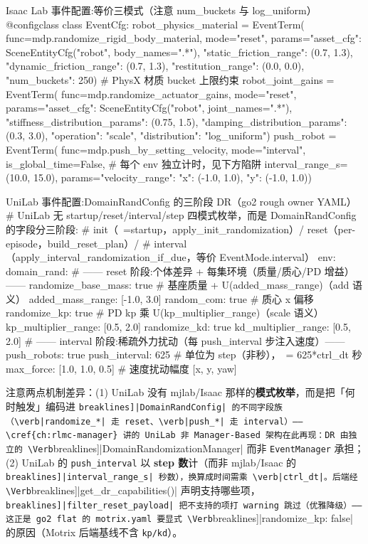 \begin{codebox}[Python]{Isaac Lab 事件配置:等价三模式（注意 num\_buckets 与 log\_uniform）}
@configclass
class EventCfg:
    robot_physics_material = EventTerm(
        func=mdp.randomize_rigid_body_material, mode="reset",
        params={"asset_cfg": SceneEntityCfg("robot", body_names=".*"),
                "static_friction_range": (0.7, 1.3),
                "dynamic_friction_range": (0.7, 1.3),
                "restitution_range": (0.0, 0.0),
                "num_buckets": 250})           # PhysX 材质 bucket 上限约束
    robot_joint_gains = EventTerm(
        func=mdp.randomize_actuator_gains, mode="reset",
        params={"asset_cfg": SceneEntityCfg("robot", joint_names=".*"),
                "stiffness_distribution_params": (0.75, 1.5),
                "damping_distribution_params": (0.3, 3.0),
                "operation": "scale", "distribution": "log_uniform"})
    push_robot = EventTerm(
        func=mdp.push_by_setting_velocity, mode="interval",
        is_global_time=False,                  # 每个 env 独立计时，见下方陷阱
        interval_range_s=(10.0, 15.0),
        params={"velocity_range": {"x": (-1.0, 1.0), "y": (-1.0, 1.0)}})
\end{codebox}

\begin{codebox}[Python]{UniLab 事件配置:DomainRandConfig 的三阶段 DR（go2 rough owner YAML）}
# UniLab 无 startup/reset/interval/step 四模式枚举，而是 DomainRandConfig 的字段分三阶段:
#   init（~=startup，apply_init_randomization）/ reset（per-episode，build_reset_plan）/
#   interval（apply_interval_randomization_if_due，等价 EventMode.interval）
env:
  domain_rand:
    # —— reset 阶段:个体差异 + 每集环境（质量/质心/PD 增益）——
    randomize_base_mass: true                  # 基座质量 + U(added_mass_range)（add 语义）
    added_mass_range: [-1.0, 3.0]
    random_com: true                           # 质心 x 偏移
    randomize_kp: true                         # PD kp 乘 U(kp_multiplier_range)（scale 语义）
    kp_multiplier_range: [0.5, 2.0]
    randomize_kd: true
    kd_multiplier_range: [0.5, 2.0]
    # —— interval 阶段:稀疏外力扰动（每 push_interval 步注入速度）——
    push_robots: true
    push_interval: 625                         # 单位为 step（非秒），~= 625*ctrl_dt 秒
    max_force: [1.0, 1.0, 0.5]                 # 速度扰动幅度 [x, y, yaw]
\end{codebox}

\noindent{}注意两点机制差异：(1) UniLab 没有 mjlab/Isaac 那样的\textbf{模式枚举}，而是把「何时触发」编码进 \Verb[breaklines]|DomainRandConfig| 的不同字段族（\verb|randomize_*| 走 reset、\verb|push_*| 走 interval）——\cref{ch:rlmc-manager} 讲的 UniLab 非 Manager-Based 架构在此再现：DR 由独立的 \Verb[breaklines]|DomainRandomizationManager| 而非 \verb|EventManager| 承担；(2) UniLab 的 \verb|push_interval| 以 \textbf{step 数}计（而非 mjlab/Isaac 的 \Verb[breaklines]|interval_range_s| 秒数），换算成时间需乘 \verb|ctrl_dt|。后端经 \Verb[breaklines]|get_dr_capabilities()| 声明支持哪些项，\Verb[breaklines]|filter_reset_payload| 把不支持的项打 warning 跳过（优雅降级）——这正是 go2 flat 的 motrix.yaml 要显式 \Verb[breaklines]|randomize_kp: false| 的原因（Motrix 后端基线不含 \verb|kp/kd|）。

